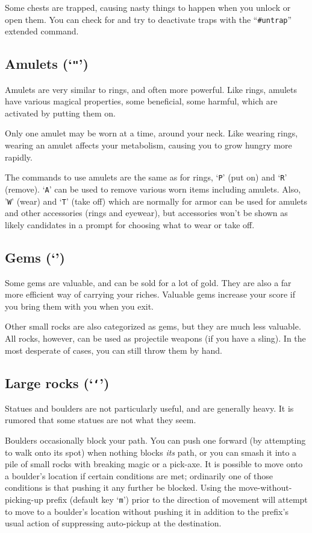 Some chests are trapped, causing nasty things to happen when you
unlock or open them.  You can check for and try to deactivate traps
with the ``{\tt \#untrap}'' extended command.

\subsection*{Amulets (`{\tt "}')}

Amulets are very similar to rings, and often more powerful.  Like
rings, amulets have various magical properties, some beneficial,
some harmful, which are activated by putting them on.

Only one amulet may be worn at a time, around your neck.
Like wearing rings, wearing an amulet affects your metabolism, causing
you to grow hungry more rapidly.

The commands to use amulets are the same as for rings, `{\tt P}' (put on)
and `{\tt R}' (remove).
`{\tt A}' can be used to remove various worn items including amulets.
Also, '{\tt W}' (wear) and `{\tt T}' (take off) which are normally for
armor can be used for amulets and other accessories (rings and eyewear),
but accessories won't be shown as likely candidates in a prompt for
choosing what to wear or take off.

\subsection*{Gems (`{\tt *}')}

Some gems are valuable, and can be sold for a lot of gold.
They are also a far more efficient way of carrying your riches.
Valuable gems increase your score if you bring them with you when you exit.

Other small rocks are also categorized as gems, but they are much less
valuable.
All rocks, however, can be used as projectile weapons (if you have a sling).
In the most desperate of cases, you can still throw them by hand.

\subsection*{Large rocks (`{\tt `}')}
Statues and boulders are not particularly useful, and are generally heavy.
It is rumored that some statues are not what they seem.

Boulders occasionally block your path.
You can push one forward (by attempting to walk onto its spot)
when nothing blocks {\it its\/} path, or you can
smash it into a pile of small rocks with breaking magic or a pick-axe.
It is possible to move onto a boulder's location if certain conditions
are met; ordinarily one of those conditions is that pushing it any
further be blocked.
Using the move-without-picking-up prefix (default key `{\tt m}')
prior to the direction of movement will attempt to move to a boulder's
location without pushing it in addition to the prefix's usual action of
suppressing auto-pickup at the destination.

